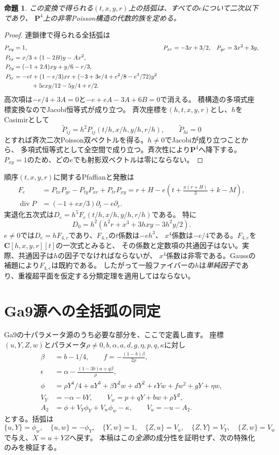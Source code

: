\documentclass[a4paper,11pt]{ltjsarticle}
\newtheorem{proposition}{命題}[section]
\theoremstyle{remark}\newtheorem{remark}[proposition]{注意}
\newcommand{\PP}{\mathbf P}
\newcommand{\CC}{\mathbf C}
\begin{document}
\begin{proposition}\label{prop:family}
この変換で得られる$(t,x,y,r)$上の括弧は、すべての$e$について二次以下であり、
$\PP^4$上の非零Poisson構造の代数的族を定める。
\end{proposition}
\begin{proof}
連鎖律で得られる全括弧は
\begin{align*}
 P_{xy}&=1,& P_{xr}&=-3x+3/2,& P_{yr}&=3x^2+3y,\\
 P_{tx}&=x/3+(1-2B)y-Ax^2,\\
 P_{ty}&=(-1+2A)xy+y/6-r/3,\\
 P_{tr}&=-et+(1-e/3)xr
       +(-3+3e/4+e^2/8-e^3/72)y^2\\
       &\hspace{10mm}+5exy/12-5y/4+r/2.
\end{align*}
高次項は$-e/4+3A=0$と$-e+eA-3A+6B=0$で消える。
積構造の多項式座標変換なのでJacobi恒等式が成り立つ。
斉次座標を$(h,t,x,y,r)$とし、$h$をCasimirとして
\[
 \widetilde P_{ij}=h^2P_{ij}(t/h,x/h,y/h,r/h),\qquad
 \widetilde P_{hi}=0
\]
とすれば斉次二次Poisson双ベクトルを得る。$h\ne0$でJacobiが成り立つことから、
多項式恒等式として全空間で成り立つ。斉次性により$\PP^4$へ降下する。
$P_{xy}=1$のため、どの$e$でも射影双ベクトルは零にならない。
\end{proof}

順序$(t,x,y,r)$に関するPfaffianと発散は
\begin{align*}
 F_e&=P_{tx}P_{yr}-P_{ty}P_{xr}+P_{tr}P_{xy}
      =r+H-e\left(t+\frac{x(r+H)}3+k-M\right),\\
 \operatorname{div}P&=(-1+ex/3)\partial_t-e\partial_r.
\end{align*}
実退化五次式は$D_e=h^5F_e(t/h,x/h,y/h,r/h)$である。
特に
\[
 D_0=h^2(h^2r+x^3+3hxy-3h^2y/2).
\]
$e\ne0$では$D_e=hF_{4,e}$であり、$F_{4,e}$の$t$係数は$-eh^3$、
$x^4$係数は$-e/4$である。$F_{4,e}$を$\CC[h,x,y,r][t]$の一次式とみると、
その係数と定数項の共通因子はない。実際、共通因子は$h$の因子でなければならないが、
$x^4$係数は非零である。Gaussの補題により$F_{4,e}$は既約である。
したがって一般ファイバーの$h$は\emph{単純因子}であり、重複超平面を仮定する分類定理を適用してはならない。

\section{Ga9源への全括弧の同定}
Ga9の十パラメータ源のうち必要な部分を、ここで定義し直す。
座標$(u,Y,Z,w)$とパラメータ$\rho\ne0,b,\alpha,a,d,g,\eta,p,q,\kappa$に対し
\begin{align*}
 \beta&=b-1/4,\qquad f=-\frac{(1-b)\beta}{2\rho},\\
 \epsilon&=\alpha-\frac{(1-3b)a+q\beta}{\rho},\\
 \phi&=\rho Y^4/4+aY^3+\beta Y^2w+dY^2+\epsilon Yw+fw^2+gY+\eta w,\\
 V_Y&=-\alpha-bY,\qquad V_w=p+qY+bw+\rho Y^2,\\
 A_2&=\phi+V_Y\phi_Y+V_w\phi_w-\kappa,\qquad V_u=-u-A_2.
\end{align*}
とする。括弧は
\[
 \{u,Y\}=\phi_w,\quad\{u,w\}=-\phi_Y,\quad\{Y,w\}=1,
 \quad\{Z,u\}=V_u,\quad\{Z,Y\}=V_Y,\quad\{Z,w\}=V_w
\]
で与え、$X=u+YZ$へ戻す。
本稿はこの\emph{全源}の成分性を証明せず、次の特殊化のみを検証する。
\end{document}
